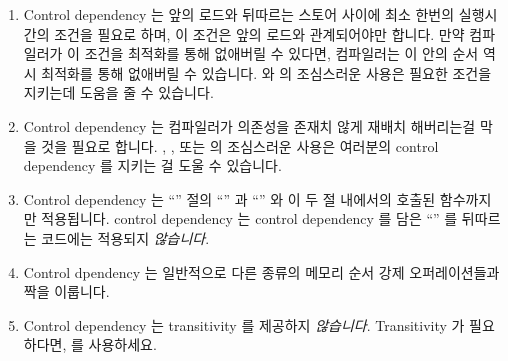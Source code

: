 \begin{enumerate}
\item	Control dependency 는 앞의 로드와 뒤따르는 스토어 사이에 최소 한번의
	실행시간의 조건을 필요로 하며, 이 조건은 앞의 로드와 관계되어야만
	합니다.
	만약 컴파일러가 이 조건을 최적화를 통해 없애버릴 수 있다면, 컴파일러는
	이 안의 순서 역시 최적화를 통해 없애버릴 수 있습니다.
	 와  의 조심스러운 사용은 필요한
	조건을 지키는데 도움을 줄 수 있습니다.

\item	Control dependency 는 컴파일러가 의존성을 존재치 않게 재배치 해버리는걸
	막을 것을 필요로 합니다.
	, , 또는  의
	조심스러운 사용은 여러분의 control dependency 를 지키는 걸 도울 수
	있습니다.

\item	Control dependency 는 ``'' 절의 ``'' 과 ``''
	와 이 두 절 내에서의 호출된 함수까지만 적용됩니다.
	control dependency 는 control dependency 를 담은 ``'' 를
	뒤따르는 코드에는 적용되지 \emph{않습니다}.

\item	Control dpendency 는 일반적으로 다른 종류의 메모리 순서 강제
	오퍼레이션들과 짝을 이룹니다.

\item	Control dependency 는 transitivity 를 제공하지 \emph{않습니다}.
	Transitivity 가 필요하다면,  를 사용하세요.

\end{enumerate}

